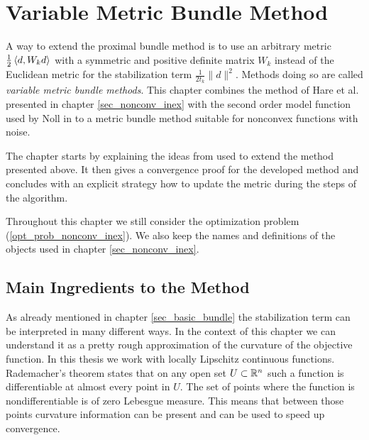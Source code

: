 \section{Variable Metric Bundle Method}
\label{sec_variable_metric}


A way to extend the proximal bundle method is to use an arbitrary metric \(\frac{1}{2}\left\langle d,W_kd \right\rangle\) with a symmetric and positive definite matrix \(W_k\) instead of the Euclidean metric for the stabilization term \(\frac{1}{2t_k}\|d\|^2\). Methods doing so are called \emph{variable metric bundle methods}.
This chapter combines the method of Hare et al. presented in chapter \ref{sec_nonconv_inex} with the second order model function used by Noll in \cite{Noll2013} to a metric bundle method suitable for nonconvex functions with noise.

The chapter starts by explaining the ideas from \cite{Noll2013} used to extend the method presented above. It then gives a convergence proof for the developed method and concludes with an explicit strategy how to update the metric during the steps of the algorithm.

Throughout this chapter we still consider the optimization problem (\ref{opt_prob_nonconv_inex}). We also keep the names and definitions of the objects used in chapter \ref{sec_nonconv_inex}.

\subsection{Main Ingredients to the Method}

As already mentioned in chapter \ref{sec_basic_bundle} the stabilization term can be interpreted in many different ways. In the context of this chapter we can understand it as a pretty rough approximation of the curvature of the objective function.
In this thesis we work with locally Lipschitz continuous functions. Rademacher's theorem \cite[Theorem 3.1, p. 18]{Heinonen2004} states that on any open set \(U \subset \mathbb{R}^n\) such a function is differentiable at almost every point in \(U\). The set of points where the function is nondifferentiable is of zero Lebesgue measure.
This means that between those points curvature information can be present and can be used to speed up convergence.

